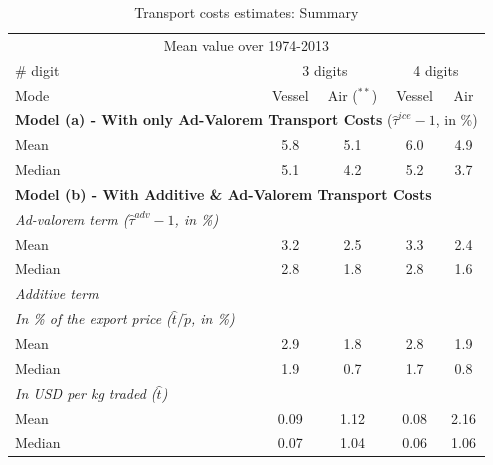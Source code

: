 \documentclass[a4paper,11pt]{article}
\begin{document}
\begin{table}[htbp]
  \centering
  \footnotesize{
  \caption{Transport costs estimates: Summary \label{tab:summary_results}}
  \begin{center}
    \begin{tabular}{l|cc|cc}
      \hline \hline
    \multicolumn{5}{c}{Mean value over 1974-2013}   \\
    \# digit & \multicolumn{2}{c}{3 digits} & \multicolumn{2}{c}{4 digits} \\ \hline
    Mode  & Vessel & Air ($^{\ast \ast}$) & Vessel & Air \\ \hline
    \multicolumn{5}{l}{\textbf{Model (a) - With only Ad-Valorem Transport Costs} ($\widehat{\tau}^{ice} -1$, in \%)}  \\ \hline
    Mean  & 5.8 & 5.1 & 6.0 & 4.9 \\
    Median & 5.1 & 4.2 & 5.2 & 3.7 \\ \hline
    \multicolumn{5}{l}{\textbf{Model (b) - With Additive \& Ad-Valorem Transport Costs} } \\ \hline
   \textit{Ad-valorem term ($\widehat{\tau}^{adv}-1$, in \%)} & & & & \\ \hline
    Mean  & 3.2 & 2.5 & 3.3 & 2.4 \\
    Median & 2.8 & 1.8 & 2.8 & 1.6 \\ \hline
    \textit{Additive term }& & & &   \\ \hline
    \textit{In \% of the export price ($\widehat{t}/\widetilde{p}$, in \%)} &&&& \\ \hline
        Mean  & 2.9 & 1.8 & 2.8 & 1.9 \\
    Median & 1.9 & 0.7 & 1.7 & 0.8 \\ \hline
   \textit{In USD per kg traded ($\widehat{t}$)}&&&& \\ \hline
    Mean & 0.09	&1.12	&0.08&	2.16 \\
    Median & 0.07	&1.04	&0.06&	1.06 \\ \hline

\end{tabular}
\end{center}}
\end{table}
\end{document}
